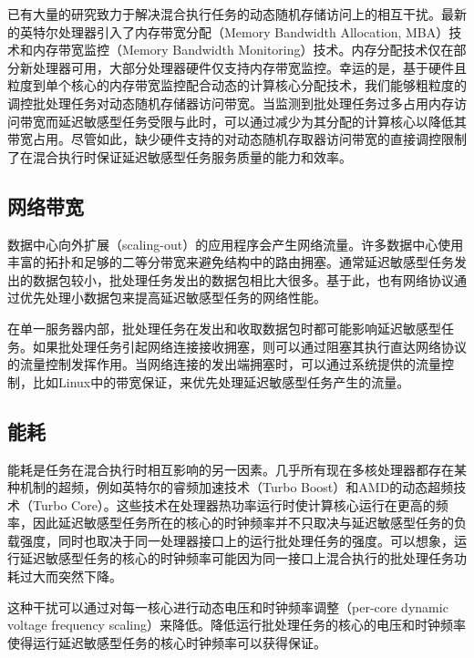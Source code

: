 已有大量的研究致力于解决混合执行任务的动态随机存储访问上的相互干扰\cite{iyer2007qos}\cite{jeong2012qos}\cite{muralidhara2011reducing}\cite{nesbit2006fair}。最新的英特尔处理器引入了内存带宽分配（Memory Bandwidth Allocation, MBA）技术和内存带宽监控（Memory Bandwidth Monitoring）技术\cite{iyer2007qos}\cite{guide2011intel}。内存分配技术仅在部分新处理器可用，大部分处理器硬件仅支持内存带宽监控\cite{guide2011intel}。幸运的是，基于硬件且粒度到单个核心的内存带宽监控配合动态的计算核心分配技术，我们能够粗粒度的调控批处理任务对动态随机存储器访问带宽\cite{lo2015heracles}。当监测到批处理任务过多占用内存访问带宽而延迟敏感型任务受限与此时，可以通过减少为其分配的计算核心以降低其带宽占用。尽管如此，缺少硬件支持的对动态随机存取器访问带宽的直接调控限制了在混合执行时保证延迟敏感型任务服务质量的能力和效率。

\subsection{网络带宽}
数据中心向外扩展（scaling-out）的应用程序会产生网络流量。许多数据中心使用丰富的拓扑和足够的二等分带宽来避免结构中的路由拥塞\cite{al2008scalable}\cite{issariyakul2011introduction}。通常延迟敏感型任务发出的数据包较小，批处理任务发出的数据包相比大很多。基于此，也有网络协议通过优先处理小数据包来提高延迟敏感型任务的网络性能\cite{wilson2011better}\cite{alizadeh2010data}。

在单一服务器内部，批处理任务在发出和收取数据包时都可能影响延迟敏感型任务。如果批处理任务引起网络连接接收拥塞，则可以通过阻塞其执行直达网络协议的流量控制发挥作用\cite{podlesny2012solving}。当网络连接的发出端拥塞时，可以通过系统提供的流量控制，比如Linux中的带宽保证，来优先处理延迟敏感型任务产生的流量\cite{brown2006traffic}。


\subsection{能耗}
能耗是任务在混合执行时相互影响的另一因素。几乎所有现在多核处理器都存在某种机制的超频，例如英特尔的睿频加速技术（Turbo Boost）和AMD的动态超频技术（Turbo Core）。这些技术在处理器热功率运行时使计算核心运行在更高的频率，因此延迟敏感型任务所在的核心的时钟频率并不只取决与延迟敏感型任务的负载强度，同时也取决于同一处理器接口上的运行批处理任务的强度。可以想象，运行延迟敏感型任务的核心的时钟频率可能因为同一接口上混合执行的批处理任务功耗过大而突然下降。

这种干扰可以通过对每一核心进行动态电压和时钟频率调整（per-core dynamic voltage frequency scaling）来降低。降低运行批处理任务的核心的电压和时钟频率使得运行延迟敏感型任务的核心时钟频率可以获得保证。




